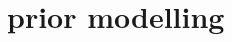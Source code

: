 \chapter{prior modelling}

\begin{figure}[ht!]
	\centering
	
	\caption[]{}
	\label{fig:}
\end{figure}

\begin{figure}[ht!]
	\centering
	
	\caption[]{}
	\label{fig:}
\end{figure}